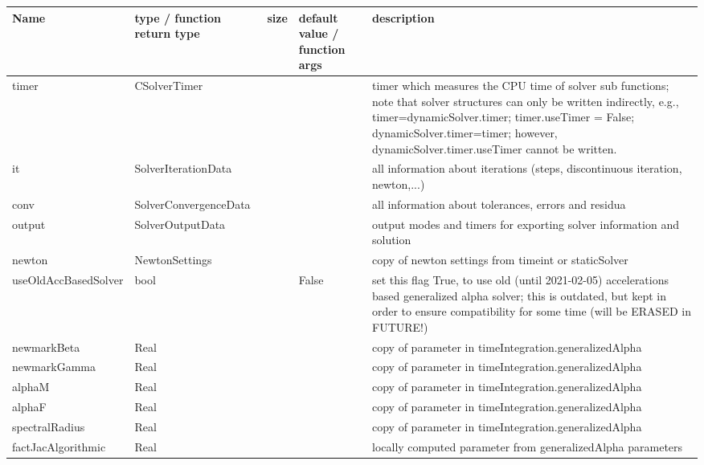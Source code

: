 \begin{center}
  \footnotesize
  \begin{longtable}{| p{4.2cm} | p{2.5cm} | p{0.3cm} | p{3.0cm} | p{6cm} |}
    \hline
    \bf Name & \bf type / function return type & \bf size & \bf default value / function args & \bf description \\ \hline
    timer &     CSolverTimer &      &      &     timer which measures the CPU time of solver sub functions; note that solver structures can only be written indirectly, e.g.,  timer=dynamicSolver.timer; timer.useTimer = False; dynamicSolver.timer=timer; however, dynamicSolver.timer.useTimer cannot be written.\\ \hline
    it &     SolverIterationData &      &      &     all information about iterations (steps, discontinuous iteration, newton,...)\\ \hline
    conv &     SolverConvergenceData &      &      &     all information about tolerances, errors and residua\\ \hline
    output &     SolverOutputData &      &      &     output modes and timers for exporting solver information and solution\\ \hline
    newton &     NewtonSettings &      &      &     copy of newton settings from timeint or staticSolver\\ \hline
    useOldAccBasedSolver &     bool &      &     False &     set this flag True, to use old (until 2021-02-05) accelerations based generalized alpha solver; this is outdated, but kept in order to ensure compatibility for some time (will be ERASED in FUTURE!)\\ \hline
    newmarkBeta &     Real &      &      &     copy of parameter in timeIntegration.generalizedAlpha\\ \hline
    newmarkGamma &     Real &      &      &     copy of parameter in timeIntegration.generalizedAlpha\\ \hline
    alphaM &     Real &      &      &     copy of parameter in timeIntegration.generalizedAlpha\\ \hline
    alphaF &     Real &      &      &     copy of parameter in timeIntegration.generalizedAlpha\\ \hline
    spectralRadius &     Real &      &      &     copy of parameter in timeIntegration.generalizedAlpha\\ \hline
    factJacAlgorithmic &     Real &      &      &     locally computed parameter from generalizedAlpha parameters\\ \hline

\end{longtable}
\end{center}
